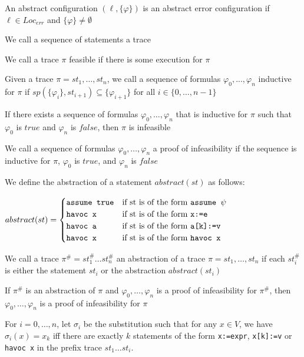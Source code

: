 \documentclass[landscape, a4paper]{article}
\begin{document}
\begin{minipage}[t]{0.2\linewidth}
\begin{betterlist}
		\item \color{orange}An abstract configuration $(\ell, \{\varphi\})$ is an \alert{abstract error configuration} if $\ell \in Loc_{err}$ and $\{\varphi\}\ne \emptyset$\color{black}
		\item \color{orange}We call a sequence of statements a \alert{trace}\color{black}
		\begin{betterlist}
			\item We call a trace $\pi$ \alert{feasible} if there is some execution for $\pi$
		\end{betterlist}
		\item \color{orange}Given a trace $\pi = st_1, \ldots, st_n$, we call a \alert{sequence of formulas} $\varphi_0, . . . , \varphi_n$ \alert{inductive for $\pi$} if $sp(\{\varphi_i\}, st_{i+1}) \subseteq \{\varphi_{i+1}\}$ for all $i \in \{0, \ldots, n−1\}$\color{black} %
		\item If there exists a sequence of formulas $\varphi_0, \ldots , \varphi_n$ that is inductive for $\pi$ such that $\varphi_0$ is $true$ and $\varphi_n$ is $false$, then $\pi$ is infeasible
		\item \color{orange}We call a sequence of formulas $\varphi_0, \ldots , \varphi_n$ a \alert{proof of infeasibility} if the sequence is inductive for $\pi$, $\varphi_0$ is $true$, and $\varphi_n$ is $false$\color{black}
		\item We define the \alert{abstraction of a statement} $abstract(st)$ as follows:

		$abstract(st) = \begin{cases}
				\verb|assume true| & \text{if st is of the form } \verb|assume |\psi \\
				\verb|havoc x|     & \text{if st is of the form } \verb|x:=e|        \\
				\verb|havoc a|     & \text{if st is of the form } \verb|a[k]:=v|     \\
				\verb|havoc x|     & \text{if st is of the form } \verb|havoc x|
			\end{cases}$
		\item We call a trace $\pi^\# = st^\#_1 \ldots st^\#_n$ an \alert{abstraction of a trace} $\pi = st_1, \ldots, st_n$ if each $st^\#_i$ is either the statement $st_i$ or the abstraction $abstract(st_i)$
		\begin{betterlist}
			\item If $\pi^\#$ is an abstraction of $\pi$ and $\varphi_0, \ldots , \varphi_n$ is a proof of infeasibility for $\pi^\#$, then $\varphi_0, \ldots , \varphi_n$ is a proof of infeasibility for $\pi$
		\end{betterlist}
		\item For $i = 0, \ldots, n$, let $\sigma_i$ be the substitution such that for any $x \in V$, we have $\sigma_i(x) = x_k$ iff there are exactly $k$ statements of the form \verb|x:=expr|, \verb|x[k]:=v| or \verb|havoc x| in the prefix trace $st_1 \ldots st_i$.


\end{betterlist}
\end{minipage}
\end{document}
